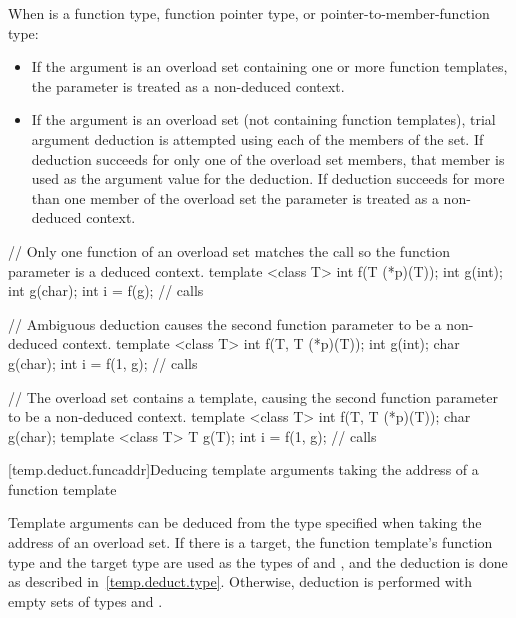 \pnum
When
is a function type, function pointer type, or pointer-to-member-function type:
\begin{itemize}
\item
If the argument is an overload set containing one or more function templates,
the parameter is treated as a non-deduced context.
\item
If the argument is an overload set (not containing function templates), trial
argument deduction is attempted using each of the members of the set. If
deduction succeeds for only one of the overload set members, that member is
used as the argument value for the deduction. If deduction succeeds for more than
one member of the overload set the parameter is treated as a non-deduced context.
\end{itemize}

\pnum
\begin{example}
\begin{codeblock}
// Only one function of an overload set matches the call so the function parameter is a deduced context.
template <class T> int f(T (*p)(T));
int g(int);
int g(char);
int i = f(g);       // calls 
\end{codeblock}
\end{example}

\pnum
\begin{example}
\begin{codeblock}
// Ambiguous deduction causes the second function parameter to be a non-deduced context.
template <class T> int f(T, T (*p)(T));
int g(int);
char g(char);
int i = f(1, g);    // calls 
\end{codeblock}
\end{example}

\pnum
\begin{example}
\begin{codeblock}
// The overload set contains a template, causing the second function parameter to be a non-deduced context.
template <class T> int f(T, T (*p)(T));
char g(char);
template <class T> T g(T);
int i = f(1, g);    // calls 
\end{codeblock}
\end{example}

[temp.deduct.funcaddr]{Deducing template arguments taking the address of a function template}

\pnum
Template arguments can be deduced from the type specified when taking
the address of an overload set.
If there is a target,
the function template's function type and the target type
are used as the types of
and
,
and the deduction is done as
described in~\ref{temp.deduct.type}.
Otherwise, deduction is performed with empty sets of types  and .

